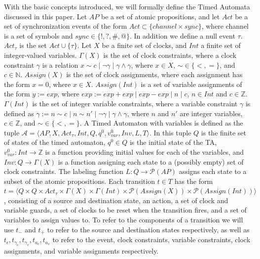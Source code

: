 \documentclass[a4paper,12pt]{article}
\newcommand*\BitOr{\mathbin{|}}
\begin{document}
With the basic concepts introduced, we will formally define the Timed Automata
discussed in this paper. Let \(AP\) be a set of atomic propositions, and let \(Act\) be a set of
synchronization events of the form $Act \subset \{channel \times sync\}$,
where channel is a set of symbols and $sync \in \{!,?,\#,@\}$. In addition we
define a null event \(\tau\). \(Act_{\tau}\) is the set \(Act \cup \{\tau\}\).
Let \(X\) be a finite set of clocks, and \(Int\) a finite set of integer-valued
variables. \(\Gamma(X)\) is the set of clock constraints, where a clock
constraint \(\gamma\) is a relation
\(x \sim c \BitOr \neg \gamma\BitOr \gamma \land \gamma\), where \(x \in X\),
\(\sim \in \{<,=\}\), and \(c \in \mathbb{N}\). \(Assign(X)\) is the set of
clock assignments, where each assignment has the form \(x {=} 0\), where
\(x \in X\iffalse{,\ c {\in} \mathbb{Z}^+}\fi\). \(Assign(Int)\) is a set of
variable assignments of the form \(y := exp\), where
\(exp := exp + exp\BitOr exp - exp\BitOr n\BitOr c\),
\(n \in Int\) and \(c \in \mathbb{Z}\). \(\Gamma(Int)\) is the set of integer
variable constraints, where a variable constraint \(\gamma\) is defined as
\(\gamma := n \sim c\BitOr n \sim n'\BitOr \neg \gamma\BitOr \gamma \land \gamma\),
where \(n\) and \(n'\) are integer variables, \(c \in \mathbb{Z}\), and
\(\sim \in \{<,=\}\). A Timed Automaton with variables is defined as the tuple
\(\mathcal{A} = \big \langle AP,X, Act_{\tau}, Int, Q, q^0, v_{var}^0, Inv, L, T \big \rangle\).
In this tuple \(Q\) is the finite set of states of the timed automaton,
\(q^0 \in Q\) is the initial state of the TA,
\(v_{var}^{0} : Int \rightarrow \mathbb{Z}\) is a function providing initial
values for each of the variables, and \(Inv : Q \rightarrow \Gamma(X)\) is a
function assigning each state to a (possibly empty) set of clock constraints.
The labeling function \(L: Q \rightarrow \mathcal{P}(AP)\) assigns each state to
a subset of the atomic propositions. Each transition \(t \in T\) has the form
\(t = \big \langle Q \times Q \times Act_{\tau} \times \Gamma(X) \times \Gamma(Int) \times \mathcal{P}(Assign(X)) \times \mathcal{P}(Assign(Int)) \big \rangle \),
consisting of a source and destination state, an action, a set of clock and
variable guards, a set of clocks to be reset when the transition fires, and a
set of variables to assign values to. To refer to the components of a transition
we will use \(t_-\) and \(t_+\) to refer to the source and destination states
respectively, as well as
\(t_\epsilon, t_{\gamma_c}, t_{\gamma_v}, t_{a_c}, t_{a_v}\) to refer to the
event, clock constraints, variable constraints, clock assignments, and variable
assignments respectively.
\end{document}
